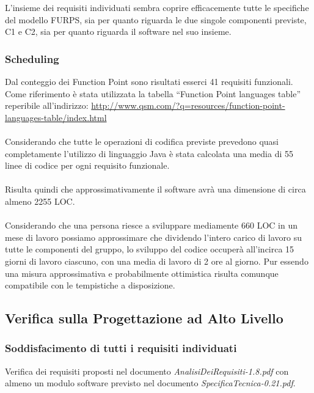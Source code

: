 L'insieme dei requisiti individuati sembra coprire efficacemente tutte le
specifiche del modello FURPS, sia per quanto riguarda le due singole componenti
previste, C1 e C2, sia per quanto riguarda il software nel suo insieme.

\subsubsection*{Scheduling}

Dal conteggio dei Function Point sono risultati esserci 41 requisiti
funzionali. Come riferimento \`e stata utilizzata la tabella ``Function Point
languages table'' reperibile all'indirizzo:
\url{http://www.qsm.com/?q=resources/function-point-languages-table/index.html}
\\\\
Considerando che tutte le operazioni di codifica previste prevedono quasi
completamente l'utilizzo di linguaggio Java \`e stata calcolata una media di 55
linee di codice per ogni requisito funzionale.
\\\\
Risulta quindi che approssimativamente il software avr\`a una dimensione di
circa almeno 2255 LOC.
\\\\
Considerando che una persona riesce a sviluppare mediamente 660 LOC in un mese
di lavoro possiamo approssimare che dividendo l'intero carico di lavoro su tutte le
componenti del gruppo, lo sviluppo del codice occuper\`a all'incirca
15 giorni di lavoro ciascuno, con una media di lavoro di 2 ore al giorno. Pur
essendo una misura approssimativa e probabilmente ottimistica risulta comunque
compatibile con le tempistiche a disposizione.

\subsection{Verifica sulla Progettazione ad Alto Livello}

\subsubsection*{Soddisfacimento di tutti i requisiti individuati}

Verifica dei requisiti proposti nel documento \emph{AnalisiDeiRequisiti-1.8.pdf}
con almeno un modulo software previsto nel documento
\emph{SpecificaTecnica-0.21.pdf}.

